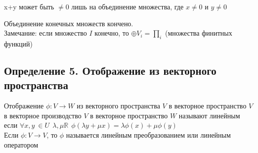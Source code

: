 \documentclass[a4paper,12pt]{article} %
\begin{document}
 	 	x+y может быть $\neq 0$ лишь на объединение множества, где $x \neq 0$ и $y \neq 0$ 
 	 	
 	 	Объединение конечных множеств кончено.\\
 	 	Замечание: если множество $I$ конечно, то $\oplus V_i = \prod_i$ (множества финитных функций)\\
 	 	
 	 	\subsection{Определение 5. Отображение из векторного пространства }
 	 	Отображение $\phi:  V \to W$ из векторного пространства $V$ в векторное пространство $V$ в векторное производство $V$ в векторное пространство $W$ называют линейным если $\forall x,y \ \in U \ \ \lambda, \mu \mathbb{R} \ \ \phi (\lambda y + \mu x) = \lambda \phi(x) + \mu \phi(y)$\\
 	 	Если $\phi: V \to V$, то $\phi$ называется линейным преобразованием или линейным оператором
\end{document}
